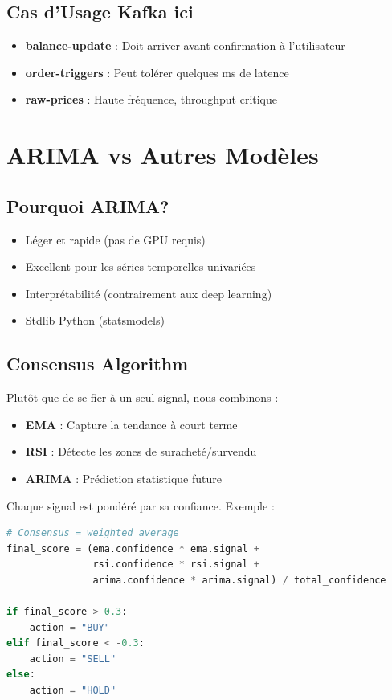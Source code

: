 \documentclass[12pt,a4paper,twoside]{report}
\begin{document}
\subsection{Cas d'Usage Kafka ici}
\begin{itemize}
    \item \textbf{balance-update} : Doit arriver avant confirmation à l'utilisateur
    \item \textbf{order-triggers} : Peut tolérer quelques ms de latence
    \item \textbf{raw-prices} : Haute fréquence, throughput critique
\end{itemize}

\section{ARIMA vs Autres Modèles}

\subsection{Pourquoi ARIMA?}
\begin{itemize}
    \item Léger et rapide (pas de GPU requis)
    \item Excellent pour les séries temporelles univariées
    \item Interprétabilité (contrairement aux deep learning)
    \item Stdlib Python (statsmodels)
\end{itemize}

\subsection{Consensus Algorithm}
Plutôt que de se fier à un seul signal, nous combinons :
\begin{itemize}
    \item \textbf{EMA} : Capture la tendance à court terme
    \item \textbf{RSI} : Détecte les zones de suracheté/survendu
    \item \textbf{ARIMA} : Prédiction statistique future
\end{itemize}

Chaque signal est pondéré par sa confiance. Exemple :

\begin{lstlisting}[language=python]
# Consensus = weighted average
final_score = (ema.confidence * ema.signal + 
               rsi.confidence * rsi.signal + 
               arima.confidence * arima.signal) / total_confidence

if final_score > 0.3:
    action = "BUY"
elif final_score < -0.3:
    action = "SELL"
else:
    action = "HOLD"
\end{lstlisting}
\end{document}
